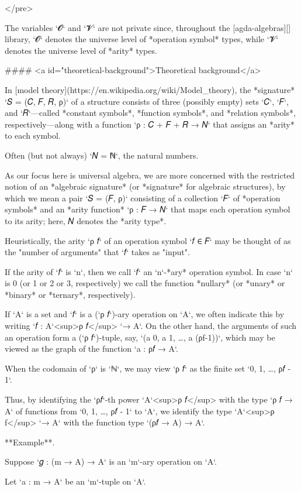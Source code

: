 </pre>

The variables `𝓞` and `𝓥` are not private since, throughout the [agda-algebras][] library,
`𝓞` denotes the universe level of *operation symbol* types, while `𝓥` denotes the universe
level of *arity* types.

#### <a id="theoretical-background">Theoretical background</a>

In [model theory](https://en.wikipedia.org/wiki/Model_theory), the *signature*
`𝑆 = (𝐶, 𝐹, 𝑅, ρ)` of a structure consists of three (possibly empty) sets `𝐶`, `𝐹`,
and `𝑅`---called *constant symbols*, *function symbols*, and *relation symbols*,
respectively---along with a function `ρ : 𝐶 + 𝐹 + 𝑅 → 𝑁` that assigns an
*arity* to each symbol.

Often (but not always) `𝑁 = ℕ`, the natural numbers.

As our focus here is universal algebra, we are more concerned with the restricted
notion of an *algebraic signature* (or *signature* for algebraic structures), by
which we mean a pair `𝑆 = (𝐹, ρ)` consisting of a collection `𝐹` of *operation
symbols* and an *arity function* `ρ : 𝐹 → 𝑁` that maps each operation symbol to
its arity; here, 𝑁 denotes the *arity type*.

Heuristically, the arity `ρ 𝑓` of an operation symbol `𝑓 ∈ 𝐹` may be thought of as
the "number of arguments" that `𝑓` takes as "input".

If the arity of `𝑓` is `n`, then we call `𝑓` an `n`-*ary* operation symbol.  In
case `n` is 0 (or 1 or 2 or 3, respectively) we call the function *nullary* (or
*unary* or *binary* or *ternary*, respectively).

If `A` is a set and `𝑓` is a (`ρ 𝑓`)-ary operation on `A`, we often indicate this
by writing `𝑓 : A`<sup>ρ 𝑓</sup> `→ A`. On the other hand, the arguments of such
an operation form a (`ρ 𝑓`)-tuple, say, `(a 0, a 1, …, a (ρf-1))`, which may be
viewed as the graph of the function `a : ρ𝑓 → A`.

When the codomain of `ρ` is `ℕ`, we may view `ρ 𝑓` as the finite set `{0, 1, …, ρ𝑓 - 1}`.

Thus, by identifying the `ρ𝑓`-th power `A`<sup>ρ 𝑓</sup> with the type `ρ 𝑓 → A` of
functions from `{0, 1, …, ρ𝑓 - 1}` to `A`, we identify the type
`A`<sup>ρ f</sup> `→ A` with the function type `(ρ𝑓 → A) → A`.

**Example**.

Suppose `𝑔 : (m → A) → A` is an `m`-ary operation on `A`.

Let `a : m → A` be an `m`-tuple on `A`.

